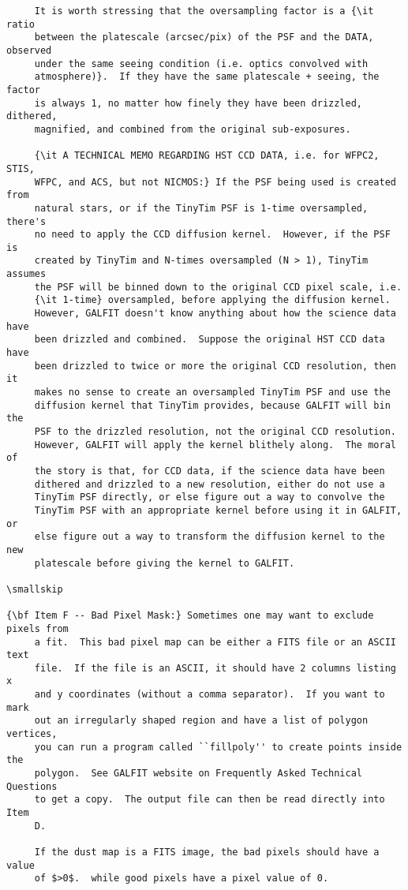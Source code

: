 \documentclass[preprint]{aastex}
\begin{document}
\begin {verbatim}
	 It is worth stressing that the oversampling factor is a {\it ratio
	 between the platescale (arcsec/pix) of the PSF and the DATA, observed
	 under the same seeing condition (i.e. optics convolved with
	 atmosphere)}.  If they have the same platescale + seeing, the factor
	 is always 1, no matter how finely they have been drizzled, dithered,
	 magnified, and combined from the original sub-exposures.

	 {\it A TECHNICAL MEMO REGARDING HST CCD DATA, i.e. for WFPC2, STIS,
	 WFPC, and ACS, but not NICMOS:} If the PSF being used is created from
	 natural stars, or if the TinyTim PSF is 1-time oversampled, there's
	 no need to apply the CCD diffusion kernel.  However, if the PSF is
	 created by TinyTim and N-times oversampled (N > 1), TinyTim assumes
	 the PSF will be binned down to the original CCD pixel scale, i.e.
	 {\it 1-time} oversampled, before applying the diffusion kernel.
	 However, GALFIT doesn't know anything about how the science data have
	 been drizzled and combined.  Suppose the original HST CCD data have
	 been drizzled to twice or more the original CCD resolution, then it
	 makes no sense to create an oversampled TinyTim PSF and use the
	 diffusion kernel that TinyTim provides, because GALFIT will bin the
	 PSF to the drizzled resolution, not the original CCD resolution.
	 However, GALFIT will apply the kernel blithely along.  The moral of
	 the story is that, for CCD data, if the science data have been
	 dithered and drizzled to a new resolution, either do not use a
	 TinyTim PSF directly, or else figure out a way to convolve the
	 TinyTim PSF with an appropriate kernel before using it in GALFIT, or
	 else figure out a way to transform the diffusion kernel to the new
	 platescale before giving the kernel to GALFIT.

\smallskip

{\bf Item F -- Bad Pixel Mask:} Sometimes one may want to exclude pixels from
	 a fit.  This bad pixel map can be either a FITS file or an ASCII text
	 file.  If the file is an ASCII, it should have 2 columns listing x
	 and y coordinates (without a comma separator).  If you want to mark
	 out an irregularly shaped region and have a list of polygon vertices,
	 you can run a program called ``fillpoly'' to create points inside the
	 polygon.  See GALFIT website on Frequently Asked Technical Questions
	 to get a copy.  The output file can then be read directly into Item
	 D.

	 If the dust map is a FITS image, the bad pixels should have a value
	 of $>0$.  while good pixels have a pixel value of 0.


\end{verbatim}
\end{document}
